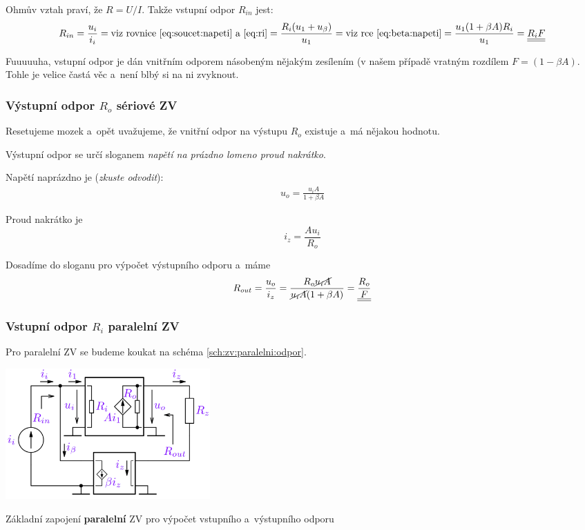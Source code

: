 \documentclass[a4paper,12pt]{article}   %
\begin{document}
Ohmův vztah praví, že $R=U/I$. Takže vstupní odpor $R_{in}$ jest:
\begin{equation}
    R_{in} = \frac{u_i}{i_i} = \text{viz rovnice \eqref{eq:soucet:napeti} a~\eqref{eq:ri}} = \frac{R_i(u_\text{1}+u_\beta)}{u_1} = \text{viz rce \eqref{eq:beta:napeti}} = \frac{u_\text{1}(1+\beta A)R_i}{u_\text{1}} = \underline{\underline{R_i F}}
\end{equation}

Fuuuuuha, vstupní odpor je dán vnitřním odporem násobeným nějakým zesílením (v našem případě vratným rozdílem $F=(1-\beta A)$. Tohle je velice častá věc a~není blbý si na ni zvyknout.


\subsubsection*{Výstupní odpor $R_o$ sériové ZV}

Resetujeme mozek a~opět uvažujeme, že vnitřní odpor na výstupu $R_o$ existuje a~má nějakou hodnotu.

Výstupní odpor se určí sloganem \textit{napětí na prázdno lomeno proud nakrátko}. 

Napětí naprázdno je (\textit{zkuste odvodit}):
\begin{align*}
    u_o = \frac{u_i A}{1+\beta A}
\end{align*}

Proud nakrátko je
\begin{equation*}
    i_z = \frac{A u_i}{R_o}
\end{equation*}

Dosadíme do sloganu pro výpočet výstupního odporu a~máme
\begin{equation}
    R_{out} = \frac{u_o}{i_z} = \frac{R_o \cancel{u_i A}}{\cancel{u_i A}(1+\beta A)} = \underline{\underline{\frac{R_o}{F}}}
\end{equation}

\subsubsection*{Vstupní odpor $R_i$ paralelní ZV}
Pro paralelní ZV se budeme koukat na schéma \ref{sch:zv:paralelni:odpor}.
\begin{schema}[h!]
    \centering
    \includegraphics[height=5cm]{ZV_paralelni-odpory.PNG}
    \caption{Základní zapojení \textbf{paralelní} ZV pro výpočet vstupního a~výstupního odporu}
    \label{sch:zv:paralelni:odpor}
\end{schema}
\end{document}
